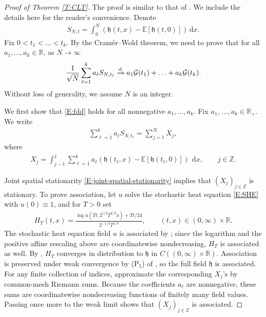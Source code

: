 \documentclass[12pt, reqno]{amsart}
\numberwithin{equation}{section}
\theoremstyle{definition}
\newcommand{\R}{\mathbb{R}}
\newcommand{\E}{\mathbb{E}}
\newcommand{\Z}{\mathbb{Z}}
\newcommand{\h}{\mathfrak{h}}
\newcommand{\dd}{\,\mathrm{d}}
\begin{document}
\begin{proof}[Proof of Theorem \ref{T:CLT}]
  The proof is similar to that of \cite[Theorem 1.1]{mueller.pu:25:spatial}. We
  include the details here for the reader's convenience. Denote
  \begin{align*}
    S_{N,t}=\int_0^N (\h(t,x)-\E[\h(t,0)]) \dd x.
  \end{align*}
  Fix $0<t_1<\ldots<t_k$. By the Cram\'{e}r--Wold theorem, we need to prove that for
  all $a_1, \ldots, a_k\in \R$, as $N\to\infty$
  \begin{align}\label{E:fdd}
    \frac{1}{\sqrt{N}}\sum_{\ell=1}^ka_\ell S_{N,t_\ell}\xrightarrow{\rm d} a_1\mathcal{G}(t_1)+
    \ldots + a_k\mathcal{G}(t_k).
  \end{align}
  Without loss of generality, we assume $N$ is an integer.


  We first show that \eqref{E:fdd} holds for all nonnegative $a_1,\ldots,a_k$.
  Fix $a_1$, $\ldots, a_k\in \R_+$. We write
  \begin{align*}
    \sum_{\ell=1}^k a_\ell S_{N, t_\ell}= \sum_{j=1}^NX_j,
  \end{align*}
  where
  \begin{align*}
    X_j=\int_{j-1}^j\sum_{\ell=1}^k
      a_\ell(\h(t_\ell,x)-\E[\h(t_\ell,0)])\,\dd x,\qquad j\in\Z.
  \end{align*}

    Joint spatial stationarity \eqref{E:joint-spatial-stationarity} implies that
  $(X_j)_{j\in\Z}$ is stationary. To prove association, let $u$ solve the
  stochastic heat equation \eqref{E:SHE} with $u(0)\equiv1$, and for $T>0$ set
  \begin{align*}
    H_T(t,x)=\frac{\log u(Tt,2^{1/3}T^{2/3}x)+Tt/24}
      {2^{-1/3}T^{1/3}},\qquad (t,x)\in(0,\infty)\times\R.
  \end{align*}
  The stochastic heat equation field $u$ is associated by
  \cite[Theorem~A.4]{chen.khoshnevisan.ea:23:central}; since the logarithm and
  the positive affine rescaling above are coordinatewise nondecreasing, $H_T$
  is associated as well. By \cite[Theorem~1.8]{wu:23:kpz}, $H_T$ converges in
  distribution to $\h$ in $C((0,\infty)\times\R)$. Association is preserved
  under weak convergence by (P$_5$) of
  \cite{esary.proschan.ea:67:association}, so the full field $\h$ is associated.
  For any finite collection of indices, approximate the corresponding $X_j$'s
  by common-mesh Riemann sums. Because the coefficients $a_\ell$ are
  nonnegative, these sums are coordinatewise nondecreasing functions of
  finitely many field values. Passing once more to the weak limit shows that
  $(X_j)_{j\in\Z}$ is associated.


\end{proof}
\end{document}
